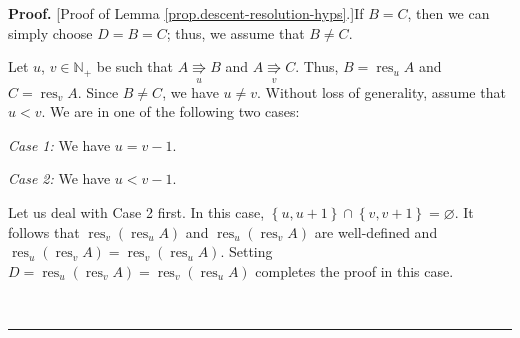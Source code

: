 \documentclass[numbers=enddot,12pt,final,onecolumn,notitlepage]{scrartcl}%
\theoremstyle{definition}
\newenvironment{proof}[1][Proof]{\noindent\textbf{#1.} }{\ \rule{0.5em}{0.5em}}
\begin{document}
\begin{proof}
[Proof of Lemma \ref{prop.descent-resolution-hyps}.]If $B=C$, then we can
simply choose $D=B=C$; thus, we assume that $B\neq C$.

Let $u$, $v \in\mathbb{N}_{+}$ be such that $A\underset{u}{\Rrightarrow}B$ and $A\underset{v}{\Rrightarrow}C$.
Thus, $B = \operatorname{res}_u A$ and $C = \operatorname{res}_v A$.
Since $B \neq C$, we have $u \neq v$.
Without loss of generality, assume that $u<v$. We are in one of the following two cases:

\textit{Case 1:} We have $u=v-1$.

\textit{Case 2:} We have $u<v-1$.

Let us deal with Case 2 first. In this
case, $\left\{  u,u+1\right\}  \cap\left\{  v,v+1\right\}
=\varnothing$.
It follows that
$\operatorname*{res}\nolimits_{v}\left(  \operatorname*{res}\nolimits_{u}%
A\right)  $ and $\operatorname*{res}\nolimits_{u}%
\left(  \operatorname*{res}\nolimits_{v}A\right)  $ are well-defined and $\operatorname*{res}\nolimits_{u}\left(
\operatorname*{res}\nolimits_{v}A\right)  =\operatorname*{res}\nolimits_{v}%
\left(  \operatorname*{res}\nolimits_{u}A\right) $. Setting
$D=\operatorname*{res}\nolimits_{u}\left(  \operatorname*{res}\nolimits_{v}%
A\right)  =\operatorname*{res}\nolimits_{v}\left(  \operatorname*{res}%
\nolimits_{u}A\right)  $ completes the proof in this case.


\end{proof}
\end{document}
